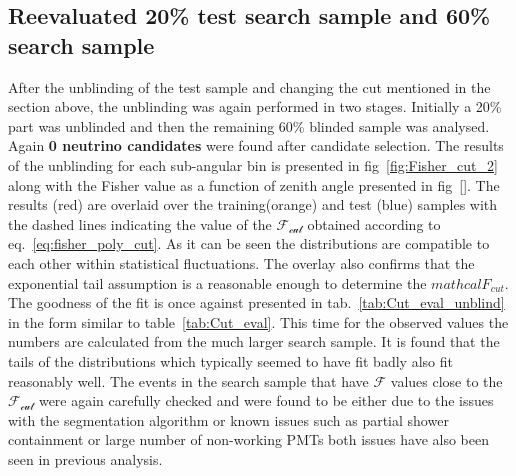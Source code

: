 \subsection{Reevaluated 20\% test search sample and 60\% search sample}
\label{subsec:unblind_60}
After the unblinding of the test sample and changing the cut mentioned in the section above, the unblinding was again performed in two stages. Initially a 20\% part was unblinded and then the remaining 60\% blinded sample was analysed. Again \textbf{0 neutrino candidates} were found after candidate selection. The results of the unblinding for each sub-angular bin is presented in fig~\ref{fig:Fisher_cut_2} along with the Fisher value as a function of zenith angle presented in fig~\ref{}. The results (red) are overlaid over the training(orange) and test (blue) samples with the dashed lines indicating the value of the $\mathcal{F_{cut}}$ obtained according to eq.~\ref{eq:fisher_poly_cut}. As it can be seen the distributions are compatible to each other within statistical fluctuations. The overlay also confirms that the exponential tail assumption is a reasonable enough to determine the $mathcal{F_{cut}}$. The goodness of the fit is once against presented in tab.~\ref{tab:Cut_eval_unblind} in the form similar to table~\ref{tab:Cut_eval}. This time for the observed values the numbers are calculated from the much larger search sample. It is found that the tails of the distributions which typically seemed to have fit badly also fit reasonably well. The events in the search sample that have $\mathcal{F}$ values close to the $\mathcal{F_{cut}}$ were again carefully checked and were found to be either due to the issues with the segmentation algorithm or known issues such as partial shower containment or large number of non-working PMTs both issues have also been seen in previous analysis. 


